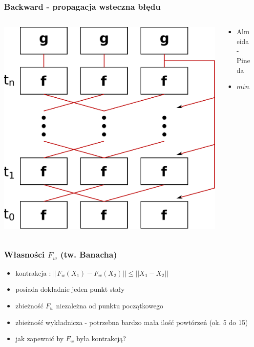 \documentclass{beamer}
\begin{document}
\begin{frame}
\frametitle{Backward - propagacja wsteczna błędu}
\begin{columns}
	\begin{column}{0.66\textwidth}
		\includegraphics[scale=0.4]{img/backward}
	\end{column}
	\begin{column}{0.34\textwidth}
		\begin{itemize}
			\item Almeida-Pineda
			\item $minErrorDiff$
		\end{itemize}
	\end{column}
\end{columns}
\end{frame}

\begin{frame}
\frametitle{Własności $F_w$ (tw. Banacha)}
\begin{itemize}
	\item kontrakcja : $||F_w(X_1) - F_w(X_2)|| \leq ||X_1 - X_2||$
	\item posiada dokładnie jeden punkt stały
	\item zbieżność $F_w$ niezależna od punktu początkowego
	\item zbieżność wykładnicza - potrzebna bardzo mała ilość powtórzeń (ok. 5 do 15)
	\item jak zapewnić by $F_w$ była kontrakcją?
\end{itemize}
\end{frame}
\end{document}
